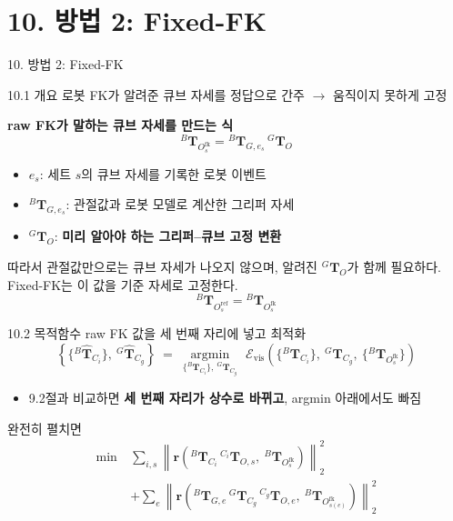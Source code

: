 \documentclass[aspectratio=169,11pt]{beamer}
\newcommand{\T}[3][]{{}^{#2}\mathbf{T}^{#1}_{#3}}   %
\newcommand{\Th}[3][]{{}^{#2}\widehat{\mathbf{T}}^{#1}_{#3}} %
\newcommand{\Oref}{O^{\mathrm{ref}}}   %
\newcommand{\Ofk}{O^{\mathrm{fk}}}     %
\begin{document}
\section{10. 방법 2: Fixed-FK}

\begin{frame}{10. 방법 2: Fixed-FK}
  \begin{block}{10.1 개요}
    로봇 FK가 알려준 큐브 자세를 정답으로 간주 $\rightarrow$ 움직이지 못하게 고정
  \end{block}
  \vfill
  \textbf{raw FK가 말하는 큐브 자세를 만드는 식}
  \[
    \T{B}{\Ofk_s}
    =
    \T{B}{G,e_s}\,\T{G}{O}
  \]
  \begin{itemize}
    \item $e_s$: 세트 $s$의 큐브 자세를 기록한 로봇 이벤트
    \item $\T{B}{G,e_s}$: 관절값과 로봇 모델로 계산한 그리퍼 자세
    \item $\T{G}{O}$: \textbf{미리 알아야 하는 그리퍼--큐브 고정 변환}
  \end{itemize}
  \vfill
  따라서 관절값만으로는 큐브 자세가 나오지 않으며,
  알려진 $\T{G}{O}$가 함께 필요하다. Fixed-FK는 이 값을 기준 자세로 고정한다.
  \[
    \T{B}{\Oref_s}=\T{B}{\Ofk_s}
  \]
\end{frame}

\begin{frame}{10.2 목적함수}
  raw FK 값을 세 번째 자리에 넣고 최적화
  {\footnotesize
  \[
    \left\{
      \{\Th{B}{C_i}\},\ \Th{G}{C_g}
    \right\}
    \ =\
    \underset{
      \{\T{B}{C_i}\},\ \T{G}{C_g}
    }{\operatorname{argmin}}
    \ \,
    \mathcal{E}_{\mathrm{vis}}
    \left(
      \{\T{B}{C_i}\},\ \T{G}{C_g},\ \{\T{B}{\Ofk_s}\}
    \right)
  \]
  }
  \begin{itemize}
    \item 9.2절과 비교하면 \textbf{세 번째 자리가 상수로 바뀌고},
      argmin 아래에서도 빠짐
  \end{itemize}
  \vfill
  완전히 펼치면
  {\footnotesize
  \[
    \begin{aligned}
      \min\ {}&
      \sum_{i,s}
      \left\|\mathbf{r}\left(
        \T{B}{C_i}\,\T{C_i}{O,s},\ \T{B}{\Ofk_s}
      \right)\right\|_2^2
      \\[4pt]
      &+
      \sum_e
      \left\|\mathbf{r}\left(
        \T{B}{G,e}\,\T{G}{C_g}\,\T{C_g}{O,e},\ \T{B}{\Ofk_{s(e)}}
      \right)\right\|_2^2
    \end{aligned}
  \]
  }
\end{frame}
\end{document}
